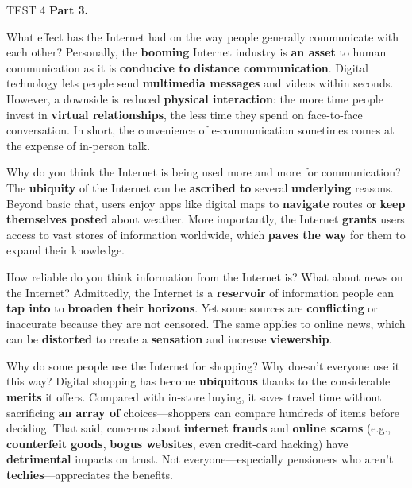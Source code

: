 \begin{glossarymc}[Cambridge 4]
\begin{test}{TEST 4}
    \noindent
    \textbf{Part 3.}
	\begin{qa}{What effect has the Internet had on the way people generally communicate with each other?}
	Personally, the \textbf{booming} Internet industry is \textbf{an asset} to human communication as it is \textbf{conducive to} \textbf{distance communication}. Digital technology lets people send \textbf{multimedia messages} and videos within seconds. However, a downside is reduced \textbf{physical interaction}: the more time people invest in \textbf{virtual relationships}, the less time they spend on face-to-face conversation. In short, the convenience of e-communication sometimes comes at the expense of in-person talk.
	\end{qa}

	\begin{qa}{Why do you think the Internet is being used more and more for communication?}
	The \textbf{ubiquity} of the Internet can be \textbf{ascribed to} several \textbf{underlying} reasons. Beyond basic chat, users enjoy apps like digital maps to \textbf{navigate} routes or \textbf{keep themselves posted} about weather. More importantly, the Internet \textbf{grants} users access to vast stores of information worldwide, which \textbf{paves the way} for them to expand their knowledge.
	\end{qa}

	\begin{qa}{How reliable do you think information from the Internet is? What about news on the Internet?}
	Admittedly, the Internet is a \textbf{reservoir} of information people can \textbf{tap into} to \textbf{broaden their horizons}. Yet some sources are \textbf{conflicting} or inaccurate because they are not censored. The same applies to online news, which can be \textbf{distorted} to create a \textbf{sensation} and increase \textbf{viewership}.
	\end{qa}

	\begin{qa}{Why do some people use the Internet for shopping? Why doesn’t everyone use it this way?}
	Digital shopping has become \textbf{ubiquitous} thanks to the considerable \textbf{merits} it offers. Compared with in-store buying, it saves travel time without sacrificing \textbf{an array of} choices—shoppers can compare hundreds of items before deciding. That said, concerns about \textbf{internet frauds} and \textbf{online scams} (e.g., \textbf{counterfeit goods}, \textbf{bogus websites}, even credit-card hacking) have \textbf{detrimental} impacts on trust. Not everyone—especially pensioners who aren’t \textbf{techies}—appreciates the benefits.
	\end{qa}


\end{test}
\end{glossarymc}
